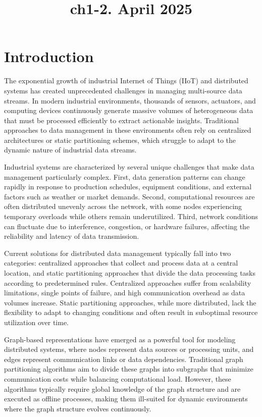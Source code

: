 \documentclass{article}
\title{ch1-2. April 2025}
\begin{document}
\maketitle


\section{Introduction}

The exponential growth of industrial Internet of Things (IIoT) and distributed systems has created unprecedented challenges in managing multi-source data streams. In modern industrial environments, thousands of sensors, actuators, and computing devices continuously generate massive volumes of heterogeneous data that must be processed efficiently to extract actionable insights. Traditional approaches to data management in these environments often rely on centralized architectures or static partitioning schemes, which struggle to adapt to the dynamic nature of industrial data streams.

Industrial systems are characterized by several unique challenges that make data management particularly complex. First, data generation patterns can change rapidly in response to production schedules, equipment conditions, and external factors such as weather or market demands. Second, computational resources are often distributed unevenly across the network, with some nodes experiencing temporary overloads while others remain underutilized. Third, network conditions can fluctuate due to interference, congestion, or hardware failures, affecting the reliability and latency of data transmission.

Current solutions for distributed data management typically fall into two categories: centralized approaches that collect and process data at a central location, and static partitioning approaches that divide the data processing tasks according to predetermined rules. Centralized approaches suffer from scalability limitations, single points of failure, and high communication overhead as data volumes increase. Static partitioning approaches, while more distributed, lack the flexibility to adapt to changing conditions and often result in suboptimal resource utilization over time.

Graph-based representations have emerged as a powerful tool for modeling distributed systems, where nodes represent data sources or processing units, and edges represent communication links or data dependencies. Traditional graph partitioning algorithms aim to divide these graphs into subgraphs that minimize communication costs while balancing computational load. However, these algorithms typically require global knowledge of the graph structure and are executed as offline processes, making them ill-suited for dynamic environments where the graph structure evolves continuously.
\\
\\
\end{document}
